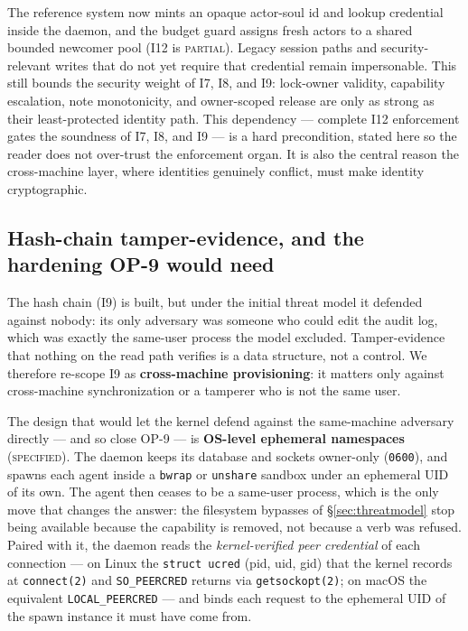 \documentclass[11pt,a4paper]{article}
\newcommand{\BuiltWeak}{{\textcolor{hhink}{\textsc{partial}}}}
\newcommand{\Designed}{{\textcolor{hhgray}{\textsc{specified}}}}
\theoremstyle{definition}
\theoremstyle{remark}
\begin{document}
The reference system now mints an opaque actor-soul id and lookup credential inside
the daemon, and the budget guard assigns fresh actors to a shared bounded newcomer
pool (I12 is \BuiltWeak). Legacy session paths and security-relevant writes that do
not yet require that credential remain impersonable. This still bounds the security
weight of I7, I8, and I9: lock-owner validity, capability escalation, note
monotonicity, and owner-scoped release are only as strong as their least-protected
identity path. This dependency --- complete I12 enforcement gates the soundness of
I7, I8, and I9 --- is a hard precondition, stated here so the reader does not
over-trust the enforcement organ. It is also the central reason the cross-machine
layer, where identities genuinely conflict, must make identity cryptographic.

\subsection{Hash-chain tamper-evidence, and the hardening OP-9 would need}
\label{sec:merkle}

The hash chain (I9) is built, but under the initial threat model it defended
against nobody: its only adversary was someone who could edit the audit log, which was
exactly the same-user process the model excluded. Tamper-evidence that
nothing on the read path verifies is a data structure, not a control. We therefore
re-scope I9 as \textbf{cross-machine provisioning}: it matters only against
cross-machine synchronization or a tamperer who is not the same user.

The design that would let the kernel defend against the same-machine adversary
directly --- and so close OP-9 --- is \textbf{OS-level ephemeral namespaces}
(\Designed). The daemon keeps its database and sockets owner-only
(\texttt{0600}), and spawns each agent inside a \texttt{bwrap} or \texttt{unshare}
sandbox under an ephemeral UID of its own. The agent then ceases to be a same-user
process, which is the only move that changes the answer: the filesystem bypasses of
\S\ref{sec:threatmodel} stop being available because the capability is removed, not
because a verb was refused. Paired with it, the daemon reads the
\emph{kernel-verified peer credential} of each connection --- on Linux the
\texttt{struct ucred} (pid, uid, gid) that the kernel records at \texttt{connect(2)}
and \texttt{SO\_PEERCRED} returns via \texttt{getsockopt(2)}; on macOS the
equivalent \texttt{LOCAL\_PEERCRED} --- and binds each request to the ephemeral UID
of the spawn instance it must have come from.
\end{document}
